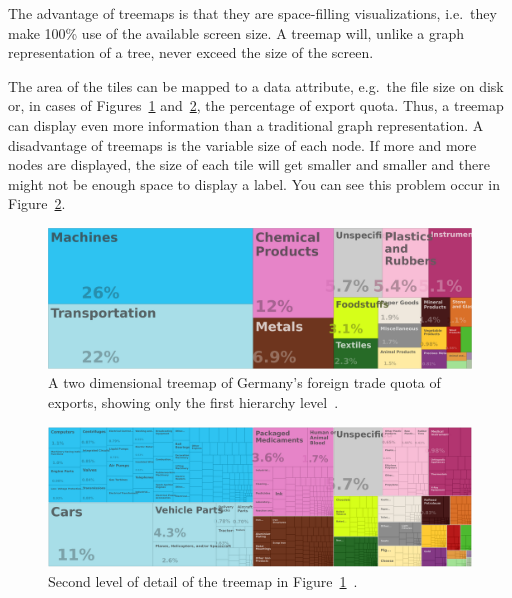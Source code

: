 The advantage of treemaps is that they are space-filling visualizations, i.e.\ they make 100\% use of the available screen size.
A treemap will, unlike a graph representation of a tree, never exceed the size of the screen.

The area of the tiles can be mapped to a data attribute, e.g.\ the file size on disk or, in cases of Figures~\ref{fig:related-work:treemap-german-exports-1} and~\ref{fig:related-work:treemap-german-exports-2}, the percentage of export quota.
Thus, a treemap can display even more information than a traditional graph representation.
A disadvantage of treemaps is the variable size of each node.
If more and more nodes are displayed, the size of each tile will get smaller and smaller and there might not be enough space to display a label.
You can see this problem occur in Figure~\ref{fig:related-work:treemap-german-exports-2}.

\begin{figure}
    \centering
    \includegraphics[width=\textwidth]{figures/related-work/en_profile_country_deu_1}
    \caption{A two dimensional treemap of Germany's foreign trade quota of exports, showing only the first hierarchy level~\parencite{Observatory2017}.}
    \label{fig:related-work:treemap-german-exports-1}
\end{figure}

\begin{figure}
    \centering
    \includegraphics[width=\textwidth]{figures/related-work/en_profile_country_deu_2}
    \caption{Second level of detail of the treemap in Figure~\ref{fig:related-work:treemap-german-exports-1}~\parencite{Observatory2017}.}
    \label{fig:related-work:treemap-german-exports-2}
\end{figure}


